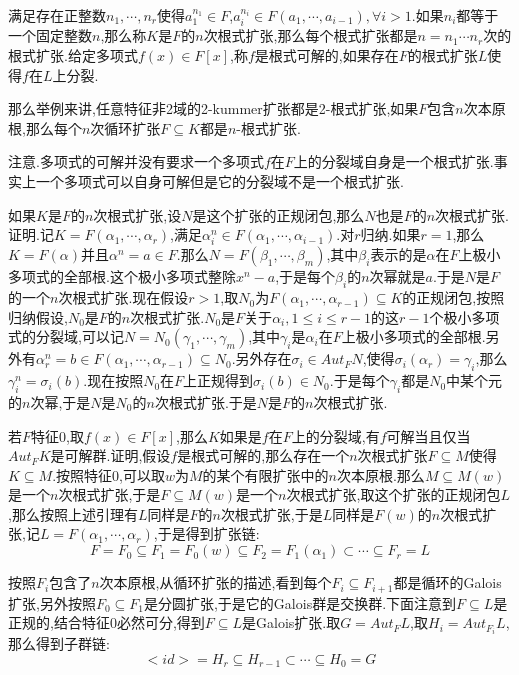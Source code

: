 满足存在正整数$n_1,\cdots,n_r$使得$a_1^{n_1}\in F$,$a_i^{n_i}\in F(a_1,\cdots,a_{i-1}),\forall i>1$.如果$n_i$都等于一个固定整数$n$,那么称$K$是$F$的$n$次根式扩张,那么每个根式扩张都是$n=n_1\cdots n_r$次的根式扩张.给定多项式$f(x)\in F[x]$,称$f$是根式可解的,如果存在$F$的根式扩张$L$使得$f$在$L$上分裂.

那么举例来讲,任意特征非2域的2-kummer扩张都是2-根式扩张,如果$F$包含$n$次本原根,那么每个$n$次循环扩张$F\subseteq K$都是$n$-根式扩张.

注意.多项式的可解并没有要求一个多项式$f$在$F$上的分裂域自身是一个根式扩张.事实上一个多项式可以自身可解但是它的分裂域不是一个根式扩张.

如果$K$是$F$的$n$次根式扩张,设$N$是这个扩张的正规闭包,那么$N$也是$F$的$n$次根式扩张.证明.记$K=F(\alpha_1,\cdots,\alpha_r)$,满足$\alpha_i^n\in F(\alpha_1,\cdots,\alpha_{i-1})$.对$r$归纳.如果$r=1$,那么$K=F(\alpha)$并且$\alpha^n=a\in F$.那么$N=F(\beta_1,\cdots,\beta_m)$,其中$\beta_i$表示的是$\alpha$在$F$上极小多项式的全部根.这个极小多项式整除$x^n-a$,于是每个$\beta_i$的$n$次幂就是$a$.于是$N$是$F$的一个$n$次根式扩张.现在假设$r>1$,取$N_0$为$F(\alpha_1,\cdots,\alpha_{r-1})\subseteq K$的正规闭包,按照归纳假设,$N_0$是$F$的$n$次根式扩张.$N_0$是$F$关于$\alpha_i,1\le i\le r-1$的这$r-1$个极小多项式的分裂域,可以记$N=N_0(\gamma_1,\cdots,\gamma_m)$,其中$\gamma_i$是$\alpha_i$在$F$上极小多项式的全部根.另外有$\alpha_r^n=b\in F(\alpha_1,\cdots,\alpha_{r-1})\subseteq N_0$.另外存在$\sigma_i\in Aut_FN$,使得$\sigma_i(\alpha_r)=\gamma_i$,那么$\gamma_i^n=\sigma_i(b)$.现在按照$N_0$在$F$上正规得到$\sigma_i(b)\in N_0$.于是每个$\gamma_i$都是$N_0$中某个元的$n$次幂,于是$N$是$N_0$的$n$次根式扩张.于是$N$是$F$的$n$次根式扩张.

若$F$特征0,取$f(x)\in F[x]$,那么$K$如果是$f$在$F$上的分裂域,有$f$可解当且仅当$Aut_FK$是可解群.证明,假设$f$是根式可解的,那么存在一个$n$次根式扩张$F\subseteq M$使得$K\subseteq M$.按照特征0,可以取$w$为$M$的某个有限扩张中的$n$次本原根.那么$M\subseteq M(w)$是一个$n$次根式扩张,于是$F\subseteq M(w)$是一个$n$次根式扩张,取这个扩张的正规闭包$L$,那么按照上述引理有$L$同样是$F$的$n$次根式扩张,于是$L$同样是$F(w)$的$n$次根式扩张,记$L=F(\alpha_1,\cdots,\alpha_r)$,于是得到扩张链:
$$F=F_0\subseteq F_1=F_0(w)\subseteq F_2=F_1(\alpha_1)\subset\cdots\subseteq F_r=L$$

按照$F_i$包含了$n$次本原根,从循环扩张的描述,看到每个$F_i\subseteq F_{i+1}$都是循环的Galois扩张,另外按照$F_0\subseteq F_1$是分圆扩张,于是它的Galois群是交换群.下面注意到$F\subseteq L$是正规的,结合特征0必然可分,得到$F\subseteq L$是Galois扩张.取$G=Aut_FL$,取$H_i=Aut_{F_i}L$,那么得到子群链:
$$<id>=H_r\subseteq H_{r-1}\subset\cdots\subseteq H_0=G$$

